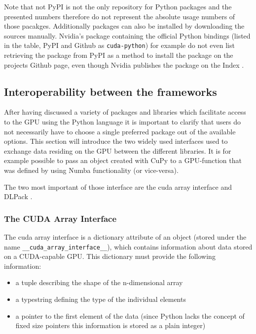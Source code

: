 \documentclass[english,11pt,a4paper,table]{article} %
\begin{document}
Note that not PyPI is not the only repository for Python packages and the presented numbers therefore do not represent the absolute usage numbers of those pacakges.
Additionally packages can also be installed by downloading the sources manually.
Nvidia's package containing the official Python bindings (listed in the table, PyPI and Github as \texttt{cuda-python}) for example do not even list retrieving the package from PyPI as a method to install the package on the projects Github page, even though Nvidia publishes the package on the Index \cite{GitHubNV49:online}.

\subsection{Interoperability between the frameworks}

After having discussed a variety of packages and libraries which facilitate access to the GPU using the Python language it is important to clarify that users do not necessarily have to choose a single preferred package out of the available options.
This section will introduce the two widely used interfaces used to exchange data residing on the GPU between the different libraries.
It is for example possible to pass an object created with CuPy to a GPU-function that was defined by using Numba functionality (or vice-versa).

The two most important of those interface are the cuda array interface \cite{CUDAArra5:online} and DLPack \cite{Welcomet97:online}.

\subsubsection{The CUDA Array Interface}

The cuda array interface is a dictionary attribute of an object (stored under the name \texttt{\_\_cuda\_array\_interface\_\_}), which contains information about data stored on a CUDA-capable GPU. This dictionary must provide the following information:

\begin{itemize}
	\item a tuple describing the shape of the n-dimensional array
	\item a typestring defining the type of the individual elements
	\item a pointer to the first element of the data (since Python lacks the concept of fixed size pointers this information is stored as a plain integer)
\end{itemize}
\end{document}
